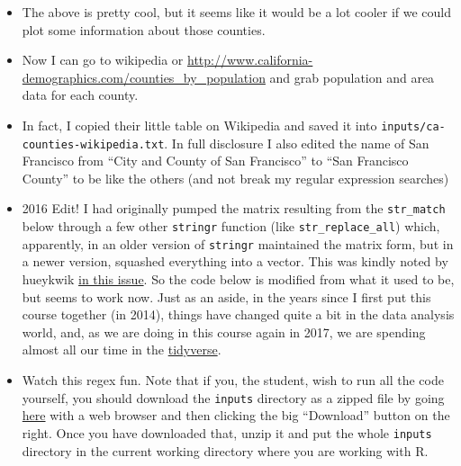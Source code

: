 \documentclass[]{book}
\providecommand{\tightlist}{%
  \setlength{\itemsep}{0pt}\setlength{\parskip}{0pt}}
\theoremstyle{definition}
\theoremstyle{definition}
\theoremstyle{remark}
\begin{document}
\begin{itemize}
\tightlist
\item
  The above is pretty cool, but it seems like it would be a lot cooler
  if we could plot some information about those counties.\\
\item
  Now I can go to wikipedia or
  \url{http://www.california-demographics.com/counties_by_population}
  and grab population and area data for each county.
\item
  In fact, I copied their little table on Wikipedia and saved it into
  \texttt{inputs/ca-counties-wikipedia.txt}. In full disclosure I also
  edited the name of San Francisco from ``City and County of San
  Francisco'' to ``San Francisco County'' to be like the others (and not
  break my regular expression searches)
\item
  2016 Edit! I had originally pumped the matrix resulting from the
  \texttt{str\_match} below through a few other \texttt{stringr}
  function (like \texttt{str\_replace\_all}) which, apparently, in an
  older version of \texttt{stringr} maintained the matrix form, but in a
  newer version, squashed everything into a vector. This was kindly
  noted by hueykwik
  \href{https://github.com/eriqande/rep-res-course/issues/74}{in this
  issue}. So the code below is modified from what it used to be, but
  seems to work now. Just as an aside, in the years since I first put
  this course together (in 2014), things have changed quite a bit in the
  data analysis world, and, as we are doing in this course again in
  2017, we are spending almost all our time in the
  \href{http://r4ds.had.co.nz/}{tidyverse}.
\item
  Watch this regex fun. Note that if you, the student, wish to run all
  the code yourself, you should download the \texttt{inputs} directory
  as a zipped file by going
  \href{https://github.com/eriqande/rep-res-eeb-2017/blob/master/inputs.zip}{here}
  with a web browser and then clicking the big ``Download'' button on
  the right. Once you have downloaded that, unzip it and put the whole
  \texttt{inputs} directory in the current working directory where you
  are working with R.
\end{itemize}
\end{document}
